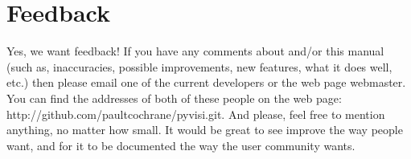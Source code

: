 \section*{Feedback}

Yes, we want feedback!  If you have any comments about \pyvisi and/or this
manual (such as, inaccuracies, possible improvements, new features, what it
does well, etc.) then please email one of the current developers or the
\pyvisi web page webmaster.  You can find the addresses of both of these
people on the \pyvisi web page:
{http://github.com/paultcochrane/pyvisi.git}.  And please, feel free to
mention anything, no matter how small.  It would be great to see \pyvisi
improve the way people want, and for it to be documented the way the \pyvisi
user community wants.
